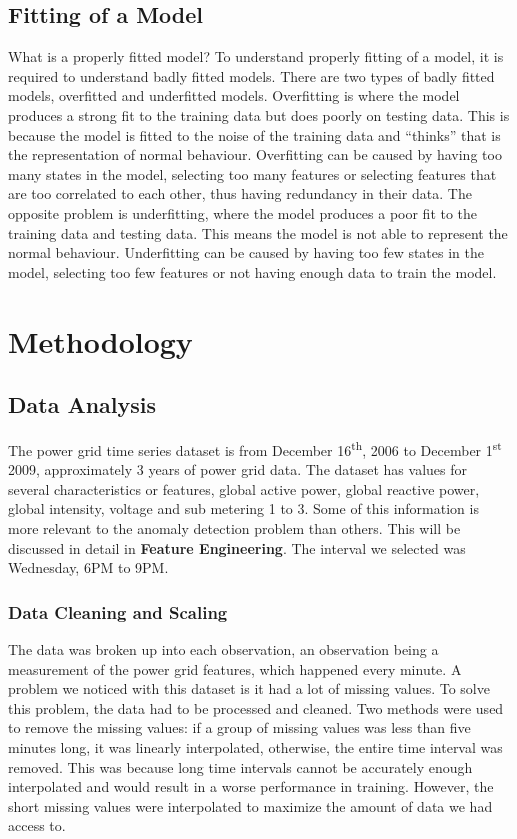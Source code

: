 \documentclass[11pt]{article}
\begin{document}
  \subsection{Fitting of a Model}
  What is a properly fitted model?  
  To understand properly fitting of a model, it is required to understand badly
  fitted models.
  There are two types of badly fitted models, overfitted and underfitted models.
  Overfitting is where the model produces a strong fit to the training data 
  but does poorly on testing data.
  This is because the model is fitted to the noise of the training data and 
  ``thinks'' that is the representation of normal behaviour.
  Overfitting can be caused by having too many states in the model, selecting 
  too many features or selecting features that are too correlated to each other, thus 
  having redundancy in their data.
  The opposite problem is underfitting, where the model produces a poor fit to the
  training data and testing data.
  This means the model is not able to represent the normal behaviour.
  Underfitting can be caused by having too few states in the model, selecting
  too few features or not having enough data to train the model.

\section{Methodology}
  \subsection{Data Analysis}
  The power grid time series dataset is from December 16\textsuperscript{th}, 2006 to December
  1\textsuperscript{st} 2009, approximately 3 years of power grid data. 
  The dataset has values for several characteristics or features, global active power, global
  reactive power, global intensity, voltage and sub metering 1 to 3. 
  Some of this information is more relevant to the anomaly detection problem than others. 
  This will be discussed in detail in \textbf{Feature Engineering}.
  The interval we selected was Wednesday, 6PM to 9PM. 

    \subsubsection{Data Cleaning and Scaling}
    The data was broken up into each observation, an observation being a measurement of the power
    grid features, which happened every minute.
    A problem we noticed with this dataset is it had a lot of missing values. 
    To solve this problem, the data had to be processed and cleaned.
    Two methods were used to remove the missing values: if a group of missing values was less than
    five minutes long, it was linearly interpolated, otherwise, the entire time interval was
    removed.
    This was because long time intervals cannot be accurately enough interpolated and would result
    in a worse performance in training.
    However, the short missing values were interpolated to maximize the amount of data we had
    access to.
\end{document}
